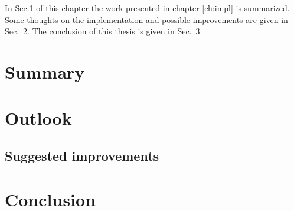 In Sec.\ref{sec:sum} of this chapter the work presented in chapter \ref{ch:impl} is summarized. Some thoughts on the implementation and possible improvements are given in Sec.~\ref{sec:outl}. The conclusion of this thesis is given in Sec.~\ref{sec:concl}.

\section{Summary}
\label{sec:sum}

 

\section{Outlook}
\label{sec:outl}


\subsection{Suggested improvements}
\label{sec:impr}



\section{Conclusion}
\label{sec:concl}
